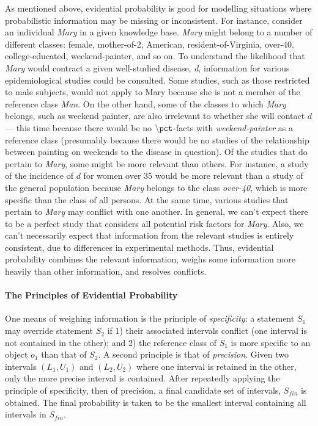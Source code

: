 As mentioned above, evidential probability is good for modelling
situations where probabilistic information may be missing or
inconsistent.  For instance, consider an individual {\em Mary} in a
given knowledge base.  {\em Mary} might belong to a number of
different classes: female, mother-of-2, American, resident-of-Virginia, over-40, college-educated, weekend-painter, and so on.  To
understand the likelihood that {\em Mary} would contract a given
well-studied disease, {\em d}, information for various epidemiological
studies could be consulted.  Some studies, such as those restricted to
male subjects, would not apply to Mary because she is not a member of the
reference class \emph{Man}.  On the other hand, some of
the classes to which {\em Mary} belongs, such as weekend painter, are
also irrelevant to whether she will contact $d$ --- this time because there
would be no ${\tt \backslash{}pct}$-facts with \emph{weekend-painter} as a reference class
(presumably because there would be no studies of the relationship between
painting on weekends to the disease in question).
Of the studies that do
pertain to {\em Mary}, some might be more relevant than others.  For
instance, a study of the incidence of $d$ for women over 35 would be
more relevant than a study of the general population because \emph{Mary}
belongs to the class \emph{over-40}, which is more specific than the class
of all persons.  At the same
time, various studies that pertain to {\em Mary} may conflict with one
another.  In general, we can't expect there to be a perfect study that
considers all potential risk factors for {\em Mary}.  Also, we can't
necessarily expect that information from the relevant studies is
entirely consistent, due to differences in experimental methods.
Thus, evidential probability combines the relevant information, weighs
some information more heavily than other information, and resolves
conflicts.

\paragraph{The Principles of Evidential Probability}
One means of weighing information is the principle of {\em
  specificity}: a statement $S_1$ may override statement $S_2$ if 1)
their associated intervals conflict (one interval is not contained in
the other); and 2) the reference class of $S_1$ is more specific to an
object $o_1$ than that of $S_2$.  A second principle is that of {\em
  precision}.  Given two intervals $(L_1,U_1)$ and $(L_2,U_2)$ where
one interval is retained in the other, only the more precise interval
is contained.  After repeatedly applying the principle of specificity,
then of precision, a final candidate set of intervals, $S_{fin}$ is
obtained.  The final probability is taken to be the smallest interval
containing all intervals in $S_{fin}$.

